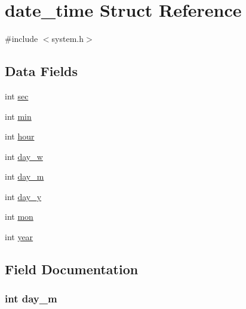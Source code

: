 \hypertarget{structdate__time}{}\section{date\+\_\+time Struct Reference}
\label{structdate__time}


{\ttfamily \#include $<$system.\+h$>$}

\subsection*{Data Fields}
\begin{DoxyCompactItemize}
\item 
int \hyperlink{structdate__time_a90c2ace84e5523d06b7162ea5928acc1}{sec}
\item 
int \hyperlink{structdate__time_a3e202b201e6255d975cd6d3aff1f5a4d}{min}
\item 
int \hyperlink{structdate__time_a15df9ba285cfd842f284025f904edc9c}{hour}
\item 
int \hyperlink{structdate__time_a65f1a8d2d8998298122653d29b282039}{day\+\_\+w}
\item 
int \hyperlink{structdate__time_a02c5941dc0947f075ee0d8f3362921bf}{day\+\_\+m}
\item 
int \hyperlink{structdate__time_ae32b944876e247e9a9fae3371d54c71f}{day\+\_\+y}
\item 
int \hyperlink{structdate__time_a25b602fa15f03b01f61a900f1f68a67d}{mon}
\item 
int \hyperlink{structdate__time_abeac221e38b7b9ce7df8722c842bf671}{year}
\end{DoxyCompactItemize}


\subsection{Field Documentation}
\hypertarget{structdate__time_a02c5941dc0947f075ee0d8f3362921bf}{}
\subsubsection[{day\+\_\+m}]{\setlength{\rightskip}{0pt plus 5cm}int day\+\_\+m}\label{structdate__time_a02c5941dc0947f075ee0d8f3362921bf}
\hypertarget{structdate__time_a65f1a8d2d8998298122653d29b282039}{}
